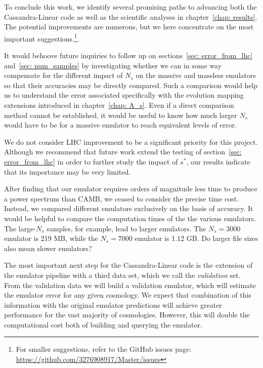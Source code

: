 


To conclude this work, we identify several promising paths to advancing
both the Cassandra-Linear code as well as the scientific analyses in
chapter~\ref{chap: results}. The potential improvements are
numerous, but we here concentrate on the most important
suggestions.\footnote{For smaller suggestions, refer to the GitHub issues 
page: \url{https://github.com/3276908917/Master/issues}}.


It would behoove future inquiries to follow up on
sections~\ref{sec: error_from_lhc} and~\ref{sec: num_samples} by investigating 
whether we
can in some way compensate for the different impact of $N_s$ on the massive
and massless emulators so that their accuracies may be directly compared.
Such a comparison would help us to understand the error associated
specifically with the evolution mapping extensions introduced in
chapter~\ref{chap: A_s}. Even if a direct comparison method cannot be
established, it would be useful to know how much larger $N_s$ would have to
be for a massive emulator to reach equivalent levels of error.

We do not consider LHC improvement to be a significant
priority for this project. Although we recommend that future work extend the
testing of section~\ref{sec: error_from_lhc} in order to further study the
impact of $s^*$, our results indicate that its importance may be very limited. 

After finding that our emulator requires orders of magnitude less
time to produce a power spectrum than CAMB, we ceased to consider the precise
time cost. Instead, we compared different emulators exclusively on the
basis of accuracy. It would be helpful to compare the computation times of the
the various emulators. The large-$N_s$ samples, for example, lead to larger
emulators. The $N_s = 3000$ emulator is 219 MB, while the $N_s = 7000$
emulator is 1.12 GB. Do larger file sizes also mean slower emulators?


The most important next step for the Cassandra-Linear code is the
extension of the emulator pipeline with a third data set, which we call the
\textit{validation} set. From the validation data we will build a validation
emulator, which will estimate the emulator error for any given cosmology.
We expect that combination of this information with the original emulator
predictions will achieve greater performance for the vast majority of
cosmologies. However, this will double the
computational cost both of building and querying the emulator.

